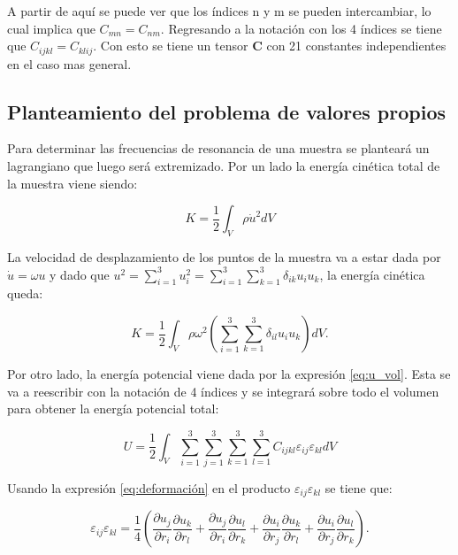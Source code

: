 \documentclass[12pt]{article}
\begin{document}
A partir de aquí se puede ver que los índices n y m se pueden intercambiar, lo cual implica que $C_{mn} = C_{nm}$. Regresando a la notación con los 4 índices se tiene que $C_{ijkl} = C_{klij}$. Con esto se tiene un tensor $\bm{C}$ con 21 constantes independientes en el caso mas general. 


\subsection{Planteamiento del problema de valores propios}

Para determinar las frecuencias de resonancia de una muestra se planteará un lagrangiano que luego será extremizado. Por un lado la energía cinética total de la muestra viene siendo:

\begin{equation}
	K = \frac{1}{2} \int_{V}{\rho \dot{u}^2} dV
\end{equation}

La velocidad de desplazamiento de los puntos de la muestra va a estar dada por $\dot{u} = \omega{u}$ y dado que $u^2 = \sum_{i=1}^{3}{u_i^2} = \sum_{i=1}^{3}{\sum_{k=1}^{3}{\delta_{ik}u_i u_k}}$, la energía cinética queda:

\begin{equation}
	K = \frac{1}{2} \int_{V}{\rho \omega^2 \left(\sum_{i=1}^{3}{\sum_{k=1}^{3}{\delta_{il} u_i u_k}} \right) dV}.
	\label{eq:K}
\end{equation}

Por otro lado, la energía potencial viene dada por la expresión \ref{eq:u_vol}. Esta se va a reescribir con la notación de 4 índices y se integrará sobre todo el volumen para obtener la energía potencial total: 

\begin{equation}
	U = \frac{1}{2} \int_{V}{\sum_{i=1}^{3}\sum_{j=1}^{3}\sum_{k=1}^{3}\sum_{l=1}^{3}{C_{ijkl}\varepsilon_{ij}\varepsilon_{kl}}dV}
	\label{eq:U_raw}
\end{equation}

Usando la expresión \ref{eq:deformación} en el producto $\varepsilon_{ij}\varepsilon_{kl}$ se tiene que:

\begin{equation}
	\varepsilon_{ij}\varepsilon_{kl} = \frac{1}{4} \left(\frac{\partial u_j}{\partial r_i} \frac{\partial u_k}{\partial r_l} + \frac{\partial u_j}{\partial r_i} \frac{\partial u_l}{\partial r_k}+\frac{\partial u_i}{\partial r_j} \frac{\partial u_k}{\partial r_l}+\frac{\partial u_i}{\partial r_j} \frac{\partial u_l}{\partial r_k} \right).
\end{equation}
\end{document}
